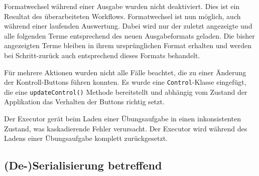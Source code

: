 \documentclass[parskip=full,11pt,openany]{scrreprt}
\begin{document}
\begin{itemize}[itemsep=3ex]
	{Formatwechsel während einer Ausgabe wurden nicht deaktiviert. Dies ist ein Resultat des überarbeiteten Workflows.}
	{Formatwechsel ist nun möglich, auch während einer laufenden Auswertung. Dabei wird nur der zuletzt angezeigte und alle folgenden Terme entsprechend des neuen Ausgabeformats geladen. Die bisher angezeigten Terme bleiben in ihrem ursprünglichen 	Format erhalten und werden bei Schritt-zurück auch entsprechend dieses Formats behandelt.}

	{Für mehrere Aktionen wurden nicht alle Fälle beachtet, die zu einer Änderung der Kontroll-Buttons führen konnten.}
	{Es wurde eine \texttt{Control}-Klasse eingefügt, die eine \texttt{updateControl()} Methode bereitstellt und abhängig vom Zustand der Applikation das Verhalten der Buttons richtig setzt.}

	{Der Executor gerät beim Laden einer Übungsaufgabe in einen inkonsistenten Zustand, was kaskadierende Fehler verursacht.}
	{Der Executor wird während des Ladens einer Übungsaufgabe komplett zurückgesetzt.}
\end{itemize}

\subsection{(De-)Serialisierung betreffend}
\end{document}
